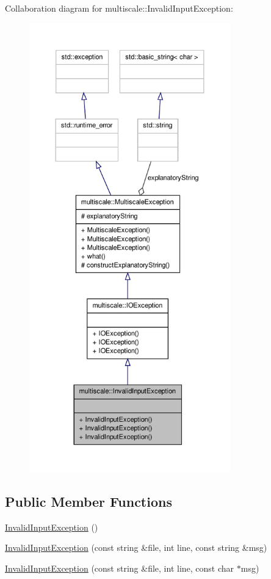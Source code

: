 \-Collaboration diagram for multiscale\-:\-:\-Invalid\-Input\-Exception\-:
\nopagebreak
\begin{figure}[H]
\begin{center}
\leavevmode
\includegraphics[height=550pt]{classmultiscale_1_1InvalidInputException__coll__graph}
\end{center}
\end{figure}
\subsection*{\-Public \-Member \-Functions}
\begin{DoxyCompactItemize}
\item 
\hyperlink{classmultiscale_1_1InvalidInputException_a97da43e8ff0bc8687952219cff9b9796}{\-Invalid\-Input\-Exception} ()
\item 
\hyperlink{classmultiscale_1_1InvalidInputException_aea7260856bd45bd4443d7626de243b72}{\-Invalid\-Input\-Exception} (const string \&file, int line, const string \&msg)
\item 
\hyperlink{classmultiscale_1_1InvalidInputException_af12fa935cdc2aacbba5ea8cda0ef8df1}{\-Invalid\-Input\-Exception} (const string \&file, int line, const char $\ast$msg)
\end{DoxyCompactItemize}


